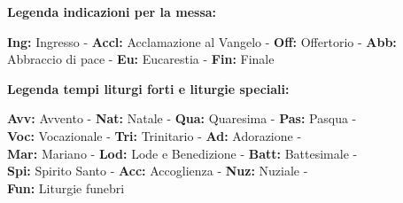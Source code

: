 
\bigskip

\textbf{Legenda indicazioni per la messa:}

\textbf{Ing:} Ingresso - \textbf{Accl:} Acclamazione al Vangelo - \textbf{Off:} Offertorio -
\textbf{Abb:} Abbraccio di pace - \textbf{Eu:} Eucarestia - \textbf{Fin:} Finale

\medskip

\textbf{Legenda tempi liturgi forti e liturgie speciali:}

\textbf{Avv:} Avvento - \textbf{Nat:} Natale - \textbf{Qua:} Quaresima - \textbf{Pas:} Pasqua -\\
\textbf{Voc:} Vocazionale - \textbf{Tri:} Trinitario - \textbf{Ad:} Adorazione - \\
\textbf{Mar:} Mariano - \textbf{Lod:} Lode e Benedizione - \textbf{Batt:} Battesimale -\\
\textbf{Spi:} Spirito Santo - \textbf{Acc:} Accoglienza - \textbf{Nuz:} Nuziale -\\
\textbf{Fun:} Liturgie funebri

\medskip


